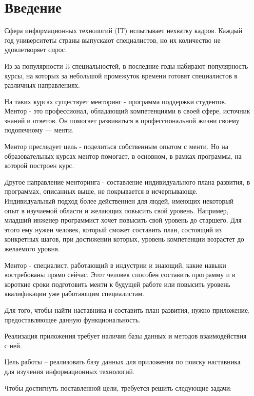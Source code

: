 \chapter*{Введение}

Сфера информационных технологий (IT) испытывает нехватку кадров. Каждый год университеты страны выпускают специалистов, но их
количество не удовлетворяет спрос.

Из-за популярности it-специальностей, в последние годы набирают популярность курсы, на которых за небольшой промежуток времени
готовят специалистов в различных направлениях.

На таких курсах существует менторинг - программа поддержки студентов. Ментор - это профессионал, обладающий компетенциями в своей сфере, источник знаний и ответов. Он помогает развиваться в профессиональной жизни своему подопечному — менти. 

Ментор преследует цель - поделиться собственным опытом с менти. Но на образовательных курсах ментор помогает, в основном, в рамках программы, на которой построен курс. 

Другое направление менторинга - составление индивидуального плана развития,  в программах, описанных выше, не покрывается в исчерпывающе. Индивидуальный подход более действеннен для людей, имеющих некоторый опыт в изучаемой области и желающих повысить свой уровень. Например, младший инженер программист хочет повысить свой уровень до старшего. Для этого ему нужен человек, который сможет составить план, состоящий из конкретных шагов, при достижении которых, уровень компетенции возрастет до желаемого уровня.  

Ментор - специалист, работающий в индустрии и знающий, какие навыки востребованы прямо сейчас. Этот человек
способен составить программу и в короткие сроки подготовить менти к будущей работе или повысить уровень квалификации уже работающим специалистам.

Для того, чтобы найти наставника и составить план развития, нужно приложение, предоставляющее данную функциональность. 

Реализация приложения требует наличия базы данных и методов взаимодействия с ней.

Цель работы -- реализовать базу данных для приложения по поиску наставника для изучения информационных технологий.

Чтобы достигнуть поставленной цели, требуется решить следующие задачи:

